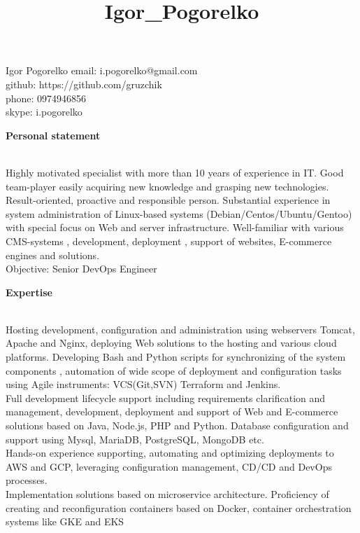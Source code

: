 \documentclass[letterpaper]{article}
\date{}
\title{Igor\_Pogorelko}
\makeatletter
\newcommand{\resheader}[6]{
    \begin{tabular*}{\textwidth}{l@{\extracolsep{\fill}}cr}
    #3 & \textbf{\LARGE #1} & #5\\
    #4 & \url{#2}           & #6\\
    \end{tabular*}
    \\
    \vspace{0.1in}
}
\renewcommand{\section}[1]{
  {
    \large \colorbox{my-gray}{
      \begin{minipage}
        {\textwidth-0.175in}
        {\textbf{#1 \vphantom{p\^{E}}}}
      \end{minipage}
    }
  }
}
\renewcommand\maketitle{}
\makeatother
\begin{document}
\maketitle
{\LARGE Igor Pogorelko} \hfill {email: i.pogorelko@gmail.com}\\
\hfill {github: https://github.com/gruzchik}\\
\hfill {phone: 0974946856}\\
\hfill {skype: i.pogorelko}\\
\vspace*{1em plus .6em minus .5em}
\section{Personal statement}
\label{sec-1-1}
\\
Highly motivated specialist with more than 10 years of experience in IT. Good team-player easily acquiring new knowledge and grasping new technologies.\\
Result-oriented, proactive and responsible person. 
Substantial experience in system administration of Linux-based systems (Debian/Centos/Ubuntu/Gentoo) with special focus on Web and server infrastructure. Well-familiar with various CMS-systems , development, deployment , support  of websites, E-commerce engines and solutions.\\
\vspace*{1em plus .6em minus .5em}
Objective: Senior DevOps Engineer\\
\section{Expertise}
\label{sec-1-1}
\\
Hosting development, configuration and administration using webservers Tomcat, Apache and Nginx, deploying Web solutions to the hosting and various cloud platforms. Developing Bash and Python scripts for synchronizing of the system components , automation of wide scope of deployment and configuration tasks using Agile instruments: VCS(Git,SVN) Terraform and Jenkins.\\
Full development lifecycle support including requirements clarification and management, development, deployment and support of Web and E-commerce solutions based on Java, Node.js, PHP and Python. Database configuration and support using Mysql, MariaDB, PostgreSQL, MongoDB etc.\\
Hands-on experience supporting, automating and optimizing deployments to AWS and GCP, leveraging configuration management, CD/CD and DevOps processes.\\
\vspace*{1em plus .6em minus .5em}
Implementation solutions based on microservice architecture. Proficiency of creating and reconfiguration containers based on Docker, container orchestration systems like GKE and EKS
\end{document}

